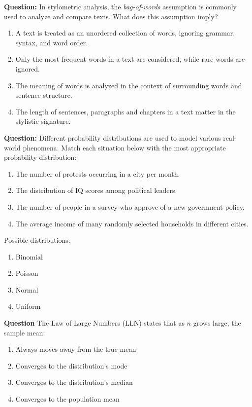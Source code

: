 \documentclass[12pt]{article}
\begin{document}
\textbf{Question:}  
In stylometric analysis, the \textit{bag-of-words} assumption is commonly used to analyze and compare texts. What does this assumption imply? 
\begin{enumerate}
    \item[(A)] A text is treated as an unordered collection of words, ignoring grammar, syntax, and word order.  
    \item[(B)] Only the most frequent words in a text are considered, while rare words are ignored.  
    \item[(C)] The meaning of words is analyzed in the context of surrounding words and sentence structure.  
    \item[(D)] The length of sentences, paragraphs and chapters in a text matter in the stylistic signature.
\end{enumerate}

\textbf{Question:}  
Different probability distributions are used to model various real-world phenomena. Match each situation below with the most appropriate probability distribution:
\begin{enumerate}
    \item[(A)] The number of protests occurring in a city per month.  
    \item[(B)] The distribution of IQ scores among political leaders.  
    \item[(C)] The number of people in a survey who approve of a new government policy.  
    \item[(D)] The average income of many randomly selected households in different cities.  
\end{enumerate}

Possible distributions:
\begin{enumerate}
    \item[(1)] Binomial  
    \item[(2)] Poisson  
    \item[(3)] Normal  
    \item[(4)] Uniform
\end{enumerate}

\textbf{Question}
The Law of Large Numbers (LLN) states that as $n$ grows large, the sample mean:
\begin{enumerate}
    \item[(A)] Always moves away from the true mean
    \item[(B)] Converges to the distribution's mode
    \item[(C)] Converges to the distribution's median
    \item[(D)] Converges to the population mean
\end{enumerate}
\end{document}
